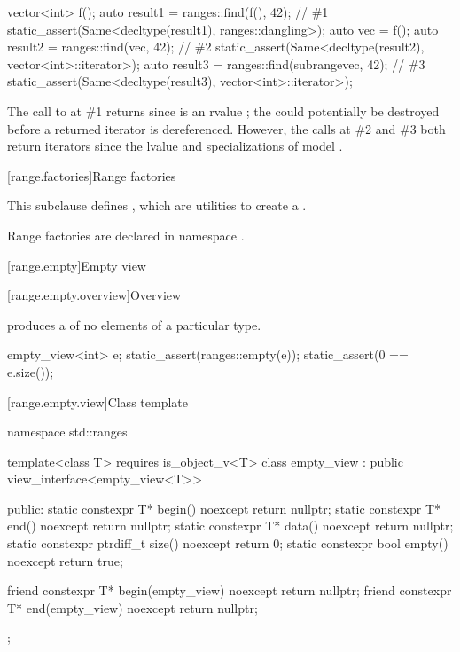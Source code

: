 \pnum
\begin{example}
\begin{codeblock}
vector<int> f();
auto result1 = ranges::find(f(), 42);                                   // \#1
static_assert(Same<decltype(result1), ranges::dangling>);
auto vec = f();
auto result2 = ranges::find(vec, 42);                                   // \#2
static_assert(Same<decltype(result2), vector<int>::iterator>);
auto result3 = ranges::find(subrange{vec}, 42);                         // \#3
static_assert(Same<decltype(result3), vector<int>::iterator>);
\end{codeblock}
The call to  at \#1 returns 
since  is an rvalue ;
the  could potentially be destroyed
before a returned iterator is dereferenced.
However, the calls at \#2 and \#3 both return iterators
since the lvalue  and specializations of 
model .
\end{example}

[range.factories]{Range factories}

\pnum
This subclause defines ,
which are utilities to create a .

\pnum
Range factories are declared in namespace .

[range.empty]{Empty view}

[range.empty.overview]{Overview}

\pnum
{} produces a  of no elements of
a particular type.

\pnum
\begin{example}
\begin{codeblock}
empty_view<int> e;
static_assert(ranges::empty(e));
static_assert(0 == e.size());
\end{codeblock}
\end{example}

[range.empty.view]{Class template }

\begin{codeblock}
namespace std::ranges {
  template<class T>
    requires is_object_v<T>
  class empty_view : public view_interface<empty_view<T>> {
  public:
    static constexpr T* begin() noexcept { return nullptr; }
    static constexpr T* end() noexcept { return nullptr; }
    static constexpr T* data() noexcept { return nullptr; }
    static constexpr ptrdiff_t size() noexcept { return 0; }
    static constexpr bool empty() noexcept { return true; }

    friend constexpr T* begin(empty_view) noexcept { return nullptr; }
    friend constexpr T* end(empty_view) noexcept { return nullptr; }
  };
}
\end{codeblock}

